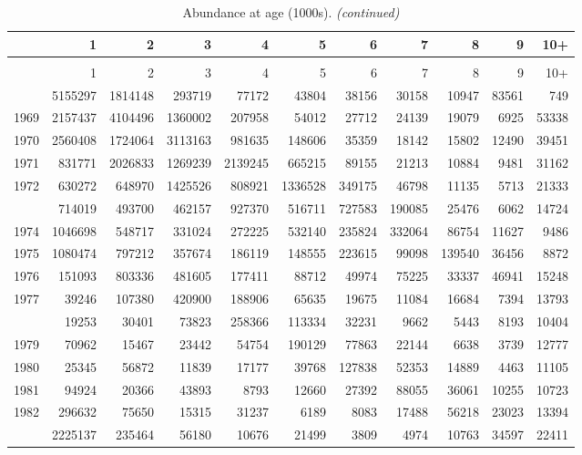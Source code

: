 \documentclass[
]{article}
\begin{document}
\begin{longtable}[t]{lrrrrrrrrrr}
\caption{\label{tab:NAA-table}Abundance at age (1000s).}\\
\toprule
  & 1 & 2 & 3 & 4 & 5 & 6 & 7 & 8 & 9 & 10+\\
\midrule
\endfirsthead
\caption[]{Abundance at age (1000s). \textit{(continued)}}\\
\toprule
  & 1 & 2 & 3 & 4 & 5 & 6 & 7 & 8 & 9 & 10+\\
\midrule
\endhead

\endfoot
\bottomrule
\endlastfoot
1968 & 5155297 & 1814148 & 293719 & 77172 & 43804 & 38156 & 30158 & 10947 & 83561 & 749\\
1969 & 2157437 & 4104496 & 1360002 & 207958 & 54012 & 27712 & 24139 & 19079 & 6925 & 53338\\
1970 & 2560408 & 1724064 & 3113163 & 981635 & 148606 & 35359 & 18142 & 15802 & 12490 & 39451\\
1971 & 831771 & 2026833 & 1269239 & 2139245 & 665215 & 89155 & 21213 & 10884 & 9481 & 31162\\
1972 & 630272 & 648970 & 1425526 & 808921 & 1336528 & 349175 & 46798 & 11135 & 5713 & 21333\\
\addlinespace
1973 & 714019 & 493700 & 462157 & 927370 & 516711 & 727583 & 190085 & 25476 & 6062 & 14724\\
1974 & 1046698 & 548717 & 331024 & 272225 & 532140 & 235824 & 332064 & 86754 & 11627 & 9486\\
1975 & 1080474 & 797212 & 357674 & 186119 & 148555 & 223615 & 99098 & 139540 & 36456 & 8872\\
1976 & 151093 & 803336 & 481605 & 177411 & 88712 & 49974 & 75225 & 33337 & 46941 & 15248\\
1977 & 39246 & 107380 & 420900 & 188906 & 65635 & 19675 & 11084 & 16684 & 7394 & 13793\\
\addlinespace
1978 & 19253 & 30401 & 73823 & 258366 & 113334 & 32231 & 9662 & 5443 & 8193 & 10404\\
1979 & 70962 & 15467 & 23442 & 54754 & 190129 & 77863 & 22144 & 6638 & 3739 & 12777\\
1980 & 25345 & 56872 & 11839 & 17177 & 39768 & 127838 & 52353 & 14889 & 4463 & 11105\\
1981 & 94924 & 20366 & 43893 & 8793 & 12660 & 27392 & 88055 & 36061 & 10255 & 10723\\
1982 & 296632 & 75650 & 15315 & 31237 & 6189 & 8083 & 17488 & 56218 & 23023 & 13394\\
\addlinespace
1983 & 2225137 & 235464 & 56180 & 10676 & 21499 & 3809 & 4974 & 10763 & 34597 & 22411\\

\end{longtable}
\end{document}
